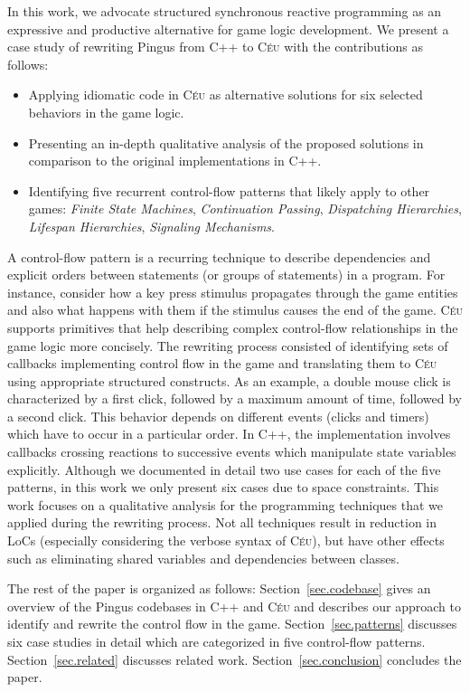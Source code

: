 \documentclass{vgtc}                          %
\newcommand{\CEU}{\textsc{C\'{e}u}\xspace}
\begin{document}
In this work, we advocate structured synchronous reactive programming as an
expressive and productive alternative for game logic development.
We present a case study of rewriting Pingus from C++ to \CEU with the
contributions as follows:
%
\begin{itemize}
\item Applying idiomatic code in \CEU as alternative solutions for six selected
      behaviors in the game logic.
\item Presenting an in-depth qualitative analysis of the proposed solutions in
      comparison to the original implementations in C++.
\item Identifying five recurrent control-flow patterns that likely apply to
      other games:
        \emph{Finite State Machines},
        \emph{Continuation Passing},
        \emph{Dispatching Hierarchies},
        \emph{Lifespan Hierarchies},
        \emph{Signaling Mechanisms}.
\end{itemize}
%
A control-flow pattern is a recurring technique to describe dependencies and
explicit orders between statements (or groups of statements) in a program.
For instance, consider how a key press stimulus propagates through the game
entities and also what happens with them if the stimulus causes the end of the
game.
%
\CEU supports primitives that help describing complex control-flow
relationships in the game logic more concisely.
%
The rewriting process consisted of identifying sets of callbacks implementing
control flow in the game and translating them to \CEU using appropriate
structured constructs.
%
As an example, a double mouse click is characterized by a first click, followed
by a maximum amount of time, followed by a second click.
This behavior depends on different events (clicks and timers) which have to
occur in a particular order.
In C++, the implementation involves callbacks crossing reactions to successive
events which manipulate state variables explicitly.
%
Although we documented in detail two use cases for each of the five patterns,
in this work we only present six cases due to space constraints.
%
This work focuses on a qualitative analysis for the programming techniques
that we applied during the rewriting process.
Not all techniques result in reduction in LoCs (especially considering the
verbose syntax of \CEU), but have other effects such as eliminating shared
variables and dependencies between classes.

The rest of the paper is organized as follows:
Section~\ref{sec.codebase} gives an overview of the Pingus codebases in C++ and
\CEU and describes our approach to identify and rewrite the control flow in the
game.
Section~\ref{sec.patterns} discusses six case studies in detail which are
categorized in five control-flow patterns.
Section~\ref{sec.related} discusses related work.
Section~\ref{sec.conclusion} concludes the paper.
\end{document}
